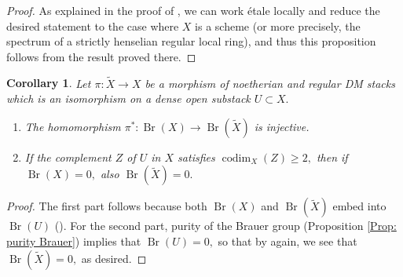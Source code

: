 \documentclass{amsart}
\newtheorem{cor}[prop]{Corollary}
\theoremstyle{definition}
\theoremstyle{remark}
\DeclareMathOperator{\codim}{codim}
\DeclareMathOperator{\Br}{Br}
\DeclareMathOperator{\Pic}{Pic}
\newcommand{\et}{\operatorname{\acute{e}t}}%
\begin{document}
\begin{proof}
As explained in the proof of \cite[Theorem 6.1]{CesnaviciusPurityBrauer}, we can work \'etale locally and reduce the desired statement to the case where $X$ is a scheme (or more precisely, the spectrum of a strictly henselian regular local ring), and thus this proposition follows from the result proved there.

\end{proof}

\begin{cor}\label{cor: Brauer groups blow ups}
    Let $\pi\colon \widetilde{X}\rightarrow X$ be a morphism of noetherian and regular DM stacks which is an isomorphism on a dense open substack $U\subset X.$ 
    \begin{enumerate}
        \item The homomorphism $\pi^{*} \colon \Br(X)\rightarrow \Br(\widetilde{X})$ is injective.
        \item If the complement $Z$ of $U$ in $X$ satisfies $\codim_{X}(Z)\geq 2,$ then if $\Br(X)=0,$ also $\Br(\widetilde{X})=0.$ 
    \end{enumerate}
\end{cor}
\begin{proof}
    The first part follows because both $\Br(X)$ and $\Br(\widetilde{X})$ embed into $\Br(U)$ (\cite[Proposition 2.5 (iv)]{AntieauMeierBrauerElliptic}). For the second part, purity of the Brauer group (Proposition \ref{Prop: purity Brauer}) implies that $\Br(U)=0,$ so that by \cite[Proposition 2.5 (iv)]{AntieauMeierBrauerElliptic} again, we see that $\Br(\widetilde{X})=0,$ as desired.
\end{proof}
\end{document}
